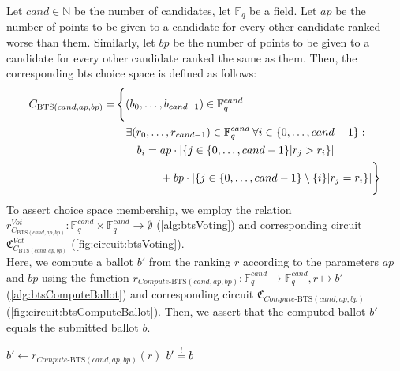 \begin{definition}
    Let $cand\in\mathbb{N}$ be the number of candidates, let $\mathbb{F}_q$ be a field.
    Let $ap$ be the number of points to be given to a candidate for every other candidate ranked worse than them.
    Similarly, let $bp$ be the number of points to be given to a candidate for every other candidate ranked the same as them.
    Then, the corresponding \gls{bts} choice space is defined as follows:
    {\setlength{\mathindent}{2pt}
    \begin{align*}
        C_{\text{BTS}(cand, ap, bp)}=& \left\{(b_0,\dots, b_{cand-1})\in \mathbb{F}_q^{cand}\Bigg| \right.\\
        & \quad\exists (r_0,\dots, r_{cand-1})\in\mathbb{F}_q^{cand}\:\forall i\in\{0,\dots, cand-1\}:\\
        & \quad\quad b_i=ap\cdot |\{j\in\{0,\dots, cand-1\}|r_j>r_i\}| \\
        & \quad\quad \phantom{b_i=}\left. \vphantom{\Bigg|}+ bp\cdot |\{j\in\{0,\dots, cand-1\}\setminus\{i\}|r_j=r_i\}|\right\}
    \end{align*}
    }
    To assert choice space membership, we employ the relation $r_{C_{\text{BTS}(cand, ap, bp)}}^{Vot}:\mathbb{F}_q^{cand}\times\mathbb{F}_q^{cand}\to\emptyset$ (\cref{alg:btsVoting}) and corresponding circuit $\mathfrak{C}_{C_{\text{BTS}(cand, ap, bp)}}^{Vot}$ (\cref{fig:circuit:btsVoting}).\\
    Here, we compute a ballot $b'$ from the ranking $r$ according to the parameters $ap$ and $bp$ using the function $r_{Compute\text{-BTS}(cand, ap, bp)}:\mathbb{F}_q^{cand}\to\mathbb{F}_q^{cand}, r\mapsto b'$ (\cref{alg:btsComputeBallot}) and corresponding circuit $\mathfrak{C}_{Compute\text{-BTS}(cand, ap, bp)}$ (\cref{fig:circuit:btsComputeBallot}).
    Then, we assert that the computed ballot $b'$ equals the submitted ballot $b$.
\end{definition}

\begin{Algorithmus}[h] %
    \caption{Function $r_{C_{\text{BTS}(cand, ap, bp)}}^{Vot}$ used to assert that a ballot $b\in\mathbb{F}_q^{cand}$ computed from a ranking $r\in\mathbb{F}_q^{cand}$ is part of the choice space $C_{\text{BTS}(cand, ap, bp)}$.
    Here, we use $r_{Compute\text{-BTS}(cand, ap, bp)}$ (\cref{alg:btsComputeBallot}) to compute the ballot $b'$ corresponding to the ranking $r$.
    }
    \label{alg:btsVoting}
    \begin{algorithmic}
        \State $b'\gets r_{Compute\text{-BTS}(cand, ap, bp)}(r)$
        \State $b'\overset{!}{=} b$
    \EndProcedure
    \end{algorithmic}
\end{Algorithmus}

